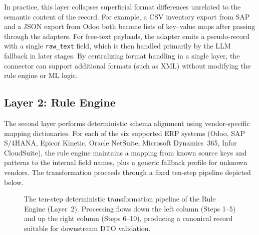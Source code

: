 \documentclass{article}
\begin{document}
In practice, this layer collapses superficial format differences unrelated to the semantic
content of the record.
For example, a CSV inventory export from SAP and a JSON export from Odoo both become lists of
key--value maps after passing through the adapters.
For free-text payloads, the adapter emits a pseudo-record with a single \texttt{raw\_text}
field, which is then handled primarily by the LLM fallback in later stages.
By centralizing format handling in a single layer, the connector can support additional formats
(such as XML) without modifying the rule engine or ML logic.

\subsection{Layer 2: Rule Engine}
The second layer performs deterministic schema alignment using vendor-specific mapping
dictionaries.
For each of the six supported ERP systems (Odoo, SAP S/4HANA, Epicor Kinetic, Oracle NetSuite,
Microsoft Dynamics~365, Infor CloudSuite), the rule engine maintains a mapping from known
source keys and patterns to the internal field names, plus a generic fallback profile for
unknown vendors.
The transformation proceeds through a fixed ten-step pipeline depicted below.

\begin{figure}[H]
  \centering
  \caption{The ten-step deterministic transformation pipeline of the Rule Engine (Layer~2).
    Processing flows down the left column (Steps 1--5) and up the right column
    (Steps 6--10), producing a canonical record suitable for downstream DTO validation.}
  \label{fig:rule-engine-pipeline}
\end{figure}
\end{document}

